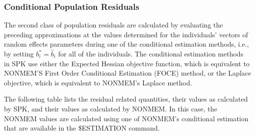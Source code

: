 \documentclass{article}
\begin{document}
\subsubsection{Conditional Population Residuals}

The second class of population residuals are calculated by evaluating the
preceding approximations at the values determined for the individuals'
vectors of random effects parameters during one of the conditional
estimation methods, i.e.,  by setting $b^{\ast}_i = \hat{b}_i$ 
for all of the individuals.
The conditional estimation methods in SPK use either the Expected Hessian
objective function, which is equivalent to NONMEM'S First Order
Conditional Estimation (FOCE) method, or the Laplace
objective, which is equivalent to NONMEM's Laplace method.

The following table lists the residual related quantities, their
values as calculated by SPK, and their values as calculated by NONMEM.
In this case, the NONMEM values are calculated using 
one of NONMEM's conditional estimation that are available in the
\$ESTIMATION command.
\end{document}
